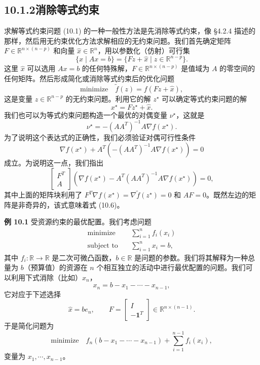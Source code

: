 \documentclass[UTF8,12pt,a4paper,fontset=fandol]{ctexart}
\begin{document}
\subsection*{10.1.2\quad 消除等式约束}

求解等式约束问题 (10.1) 的一种一般性方法是先消除等式约束，像 \S4.2.4 描述的那样，然后用无约束优化方法求解相应的无约束问题。我们首先确定矩阵 $F\in\mathbb{R}^{n\times(n-p)}$ 和向量 $\hat{x}\in\mathbb{R}^n$，用以参数化（仿射）可行集
\[
\{x\mid Ax=b\}=\{Fz+\hat{x}\mid z\in\mathbb{R}^{n-p}\}.
\]
这里 $\hat{x}$ 可以选用 $Ax=b$ 的任何特殊解，$F\in\mathbb{R}^{n\times(n-p)}$ 是值域为 $A$ 的零空间的任何矩阵。然后形成简化或消除等式约束后的优化问题
\begin{equation}
\text{minimize}\quad \tilde{f}(z)=f(Fz+\hat{x}),
\tag{10.5}
\end{equation}
这是变量 $z\in\mathbb{R}^{n-p}$ 的无约束问题。利用它的解 $z^\star$ 可以确定等式约束问题的解
\[
x^\star=Fz^\star+\hat{x}.
\]
我们也可以为等式约束问题构造一个最优的对偶变量 $\nu^\star$，这就是
\[
\nu^\star=-(AA^T)^{-1}A\nabla f(x^\star).
\]
为了说明这个表达式的正确性，我们必须验证对偶可行性条件
\begin{equation}
\nabla f(x^\star)+A^T\left(-(AA^T)^{-1}A\nabla f(x^\star)\right)=0
\tag{10.6}
\end{equation}
成立。为说明这一点，我们指出
\[
\begin{bmatrix}
F^T\\
A
\end{bmatrix}
\left(\nabla f(x^\star)-A^T(AA^T)^{-1}A\nabla f(x^\star)\right)=0,
\]
其中上面的矩阵块利用了 $F^T\nabla f(x^\star)=\nabla\tilde{f}(z^\star)=0$ 和 $AF=0$。既然左边的矩阵是非奇异的，该式意味着式 (10.6)。

\noindent\textbf{例 10.1}\quad
受资源约束的最优配置。我们考虑问题
\[
\begin{aligned}
\text{minimize}\quad & \sum_{i=1}^n f_i(x_i)\\
\text{subject to}\quad & \sum_{i=1}^n x_i=b,
\end{aligned}
\]
其中 $f_i:\mathbb{R}\to\mathbb{R}$ 是二次可微凸函数，$b\in\mathbb{R}$ 是问题的参数。我们将其解释为一种总量为 $b$（预算值）的资源在 $n$ 个相互独立的活动中进行最优配置的问题。我们可以利用下式消除（比如）$x_n$，
\[
x_n=b-x_1-\cdots-x_{n-1},
\]
它对应于下述选择
\[
\hat{x}=be_n,\qquad
F=
\begin{bmatrix}
I\\
-\mathbf{1}^T
\end{bmatrix}
\in\mathbb{R}^{n\times(n-1)}.
\]
于是简化问题为
\[
\text{minimize}\quad f_n(b-x_1-\cdots-x_{n-1})+\sum_{i=1}^{n-1}f_i(x_i),
\]
变量为 $x_1,\cdots,x_{n-1}$。
\end{document}
